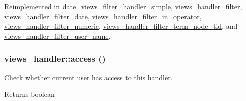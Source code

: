 Reimplemented in \hyperlink{classdate__views__filter__handler__simple_af129fdbfc4ec0a307289b09e25bd5190}{date\_\-views\_\-filter\_\-handler\_\-simple}, \hyperlink{classviews__handler__filter_a88ccd2ef359009614abb48fb83c2a738}{views\_\-handler\_\-filter}, \hyperlink{classviews__handler__filter__date_a063da758bf1832f38454620cbc94e304}{views\_\-handler\_\-filter\_\-date}, \hyperlink{classviews__handler__filter__in__operator_aff2b25941729b9ca81e1e53bb8e95a96}{views\_\-handler\_\-filter\_\-in\_\-operator}, \hyperlink{classviews__handler__filter__numeric_a0fd6abb3062be32410bef3c1cefdaaf5}{views\_\-handler\_\-filter\_\-numeric}, \hyperlink{classviews__handler__filter__term__node__tid_a75f38674ff356981f6e77f009da2101a}{views\_\-handler\_\-filter\_\-term\_\-node\_\-tid}, and \hyperlink{classviews__handler__filter__user__name_aa6ae18031b13da1c92d83b8c5de74c15}{views\_\-handler\_\-filter\_\-user\_\-name}.\hypertarget{classviews__handler_a3f2fbfe1e0849d06ae77149412b821f6}{
\subsubsection[{access}]{\setlength{\rightskip}{0pt plus 5cm}views\_\-handler::access ()}}
\label{classviews__handler_a3f2fbfe1e0849d06ae77149412b821f6}
Check whether current user has access to this handler.

\begin{DoxyReturn}{Returns}
boolean 
\end{DoxyReturn}


